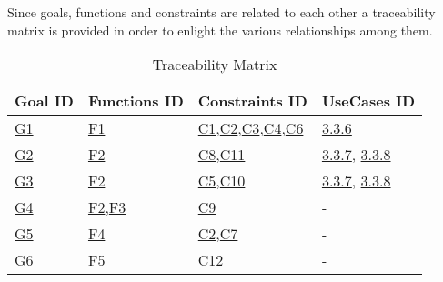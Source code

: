 Since goals, functions and constraints are related to each other a traceability matrix is provided in order to enlight the various relationships among them.
\begin{flushleft}

\begin{table}[htp]
\centering
\begin{tabular}{|l|l|l|l|}
\hline
Goal ID&Functions ID&Constraints ID&UseCases ID\\
\hline
\hyperlink{G1}{G1}&\hyperlink{sec:f1}{F1}&\hyperlink{C1}{C1},\hyperlink{C2}{C2},\hyperlink{C3}{C3},\hyperlink{C4}{C4},\hyperlink{C6}{C6}&\hyperlink{tab:reportcreationtab}{3.3.6}\\
\hline
\hyperlink{G2}{G2}&\hyperlink{sec:f2}{F2}&\hyperlink{C8}{C8},\hyperlink{C11}{C11}&\hyperlink{tab:dataminingtab}{3.3.7}, \hyperlink{tab:dataminingofficertab}{3.3.8}\\
\hline
\hyperlink{G3}{G3}&\hyperlink{sec:f2}{F2}&\hyperlink{C5}{C5},\hyperlink{C10}{C10}&\hyperlink{tab:dataminingtab}{3.3.7}, \hyperlink{tab:dataminingofficertab}{3.3.8}\\
\hline
\hyperlink{G4}{G4}&\hyperlink{sec:f2}{F2},\hyperlink{sec:f3}{F3}&\hyperlink{C9}{C9}&-\\
\hline
\hyperlink{G5}{G5}&\hyperlink{sec:f4}{F4}&\hyperlink{C2}{C2},\hyperlink{C7}{C7}&-\\
\hline
\hyperlink{G6}{G6}&\hyperlink{sec:f5}{F5}&\hyperlink{12}{C12}&-\\
\hline

\end{tabular}

\caption{Traceability Matrix} 

\end{table}

\end{flushleft}